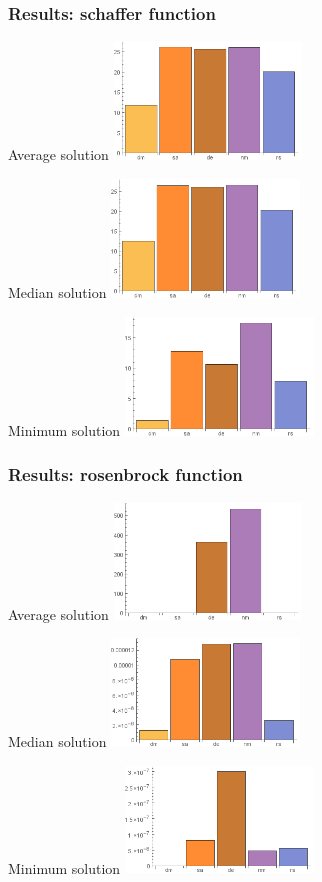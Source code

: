 \documentclass[mathserif]{beamer}
\begin{document}
\begin{frame}[allowframebreaks]
    \frametitle{Results: schaffer function}

    Average solution
    \includegraphics[width=5cm]{../figures/average-fun-schaffer.png}

    Median solution
    \includegraphics[width=5cm]{../figures/median-fun-schaffer.png}

    Minimum solution
    \includegraphics[width=5cm]{../figures/minimum-fun-schaffer.png}
\end{frame}

\begin{frame}[allowframebreaks]
    \frametitle{Results: rosenbrock function}

    Average solution
    \includegraphics[width=5cm]{../figures/average-fun-rosenbrock.png}

    Median solution
    \includegraphics[width=5cm]{../figures/median-fun-rosenbrock.png}

    Minimum solution
    \includegraphics[width=5cm]{../figures/minimum-fun-rosenbrock.png}
\end{frame}
\end{document}
